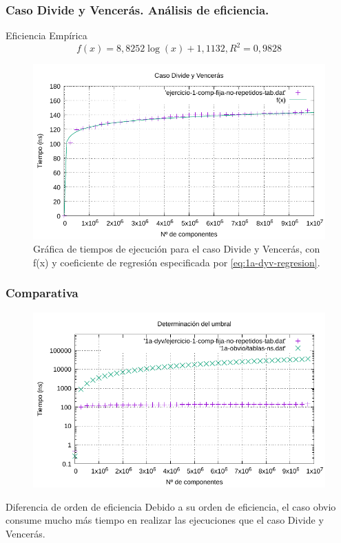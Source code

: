 \documentclass[13pt]{beamer}
\begin{document}
	\begin{frame}
		\frametitle{Caso Divide y Vencerás. Análisis de eficiencia.}
		\begin{block}{Eficiencia Empírica}
			\begin{equation}
			\boxed{f(x) = 8,8252 \log(x) + 1,1132, R^2 = 0,9828}
			\label{eq:1a-dyv-regresion}
			\end{equation}
		\end{block}
		\begin{figure}
			\centering
			\includegraphics[scale=0.76]{img/e1a-dyv}
			\caption{Gráfica de tiempos de ejecución para el caso Divide y Vencerás, 
				con f(x) y coeficiente de regresión especificada por \ref{eq:1a-dyv-regresion}.}
			\label{fig:1a-dyv-graph}
		\end{figure}
	\end{frame}

	\begin{frame}
		\frametitle{Comparativa}
		
        \begin{figure}
            \centering
            \includegraphics[scale=0.67]{img/e1a-comp.pdf}
            \label{fig:1a-comp-datos}
        \end{figure}

        \begin{alertblock}{Diferencia de orden de eficiencia}
            Debido a su orden de eficiencia, el caso obvio consume mucho más tiempo en realizar las ejecuciones
            que el caso Divide y Vencerás.
        \end{alertblock}
	\end{frame}
\end{document}
